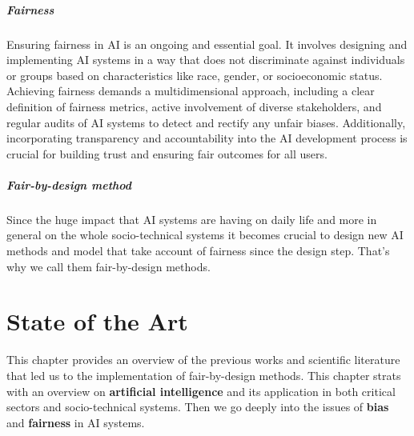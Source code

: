 \documentclass[12pt,a4paper,openright,twoside]{book}
\begin{document}
\paragraph{Fairness}
Ensuring fairness in AI is an ongoing and essential goal. It involves designing and implementing AI systems in a way that does not discriminate against individuals or groups based on characteristics like race, gender, or socioeconomic status. Achieving fairness demands a multidimensional approach, including a clear definition of fairness metrics, active involvement of diverse stakeholders, and regular audits of AI systems to detect and rectify any unfair biases. Additionally, incorporating transparency and accountability into the AI development process is crucial for building trust and ensuring fair outcomes for all users.
\paragraph{Fair-by-design method}
Since the huge impact that AI systems are having on daily life and more in general on the whole socio-technical systems it becomes crucial to design new AI methods and model that take account of fairness since the design step. That's why we call them fair-by-design methods.
\chapter{State of the Art} %
\label{chap:background}

This chapter provides an overview of the previous works and scientific literature that led us to the implementation of fair-by-design methods. This chapter strats
with an overview on \textbf{artificial intelligence} and its application in both critical sectors and socio-technical systems. Then we go deeply into the issues of \textbf{bias} and \textbf{fairness} in AI systems.
\end{document}
